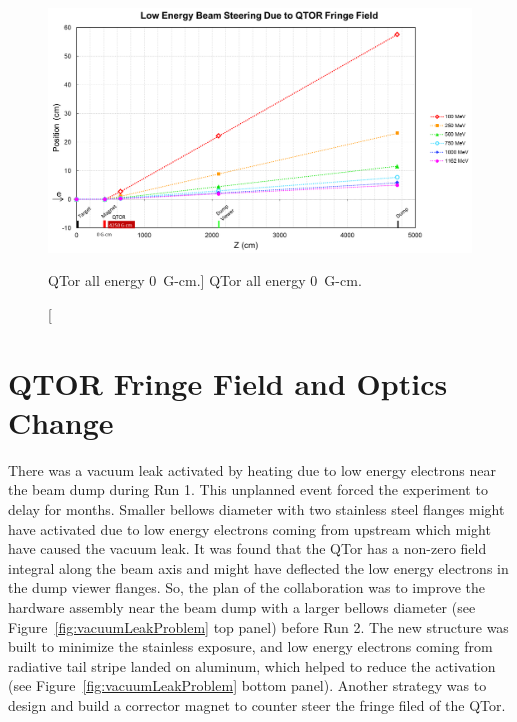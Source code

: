 \begin{singlespace}
\begin{figure}[!h]
	\begin{center}
		\includegraphics[width=15.0cm]{figures/qtor_allenergy_0Gcm}
	\end{center}
	\caption
		[QTor all energy 0~G-cm.]
		{QTor all energy 0~G-cm.}
		\label{fig:qtor_allenergy_0Gcm}
\end{figure}
\end{singlespace}


\section{QTOR Fringe Field and Optics Change}
\label{QTOR Fringe Field and Optics Change}

There was a vacuum leak activated by heating due to low energy electrons near the beam dump during Run 1.  This unplanned event forced the experiment to delay for months. 
Smaller bellows diameter with two stainless steel flanges might have activated due to low energy electrons coming from upstream which might have caused the vacuum leak. It was found that the QTor has a non-zero field integral along the beam axis and might have deflected the low energy electrons in the dump viewer flanges. So, the plan of the collaboration was to improve the hardware assembly near the beam dump with a larger bellows diameter (see Figure~\ref{fig:vacuumLeakProblem} top panel) before Run 2. The new structure was built to minimize the stainless exposure, and low energy electrons coming from radiative tail stripe landed on aluminum, which helped to reduce the activation (see Figure~\ref{fig:vacuumLeakProblem} bottom panel). Another strategy was to design and build a corrector magnet to counter steer the fringe filed of the QTor.

